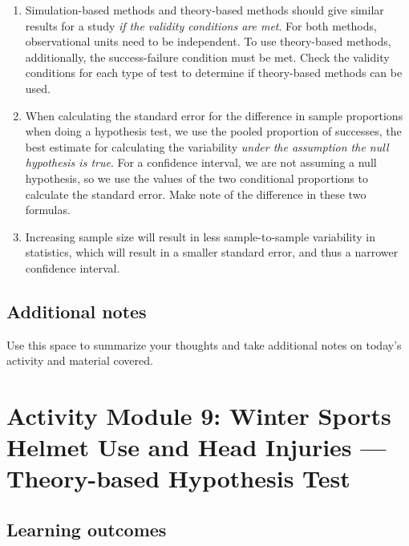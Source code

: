 \documentclass[
]{report}
\begin{document}
\begin{enumerate}
\def\labelenumi{\arabic{enumi}.}
\item
  Simulation-based methods and theory-based methods should give similar results for a study \emph{if the validity conditions are met}. For both methods, observational units need to be independent. To use theory-based methods, additionally, the success-failure condition must be met. Check the validity conditions for each type of test to determine if theory-based methods can be used.
\item
  When calculating the standard error for the difference in sample proportions when doing a hypothesis test, we use the pooled proportion of successes, the best estimate for calculating the variability \emph{under the assumption the null hypothesis is true}. For a confidence interval, we are not assuming a null hypothesis, so we use the values of the two conditional proportions to calculate the standard error. Make note of the difference in these two formulas.
\item
  Increasing sample size will result in less sample-to-sample variability in statistics, which will result in a smaller standard error, and thus a narrower confidence interval.
\end{enumerate}

\hypertarget{additional-notes-14}{%
\subsection{Additional notes}\label{additional-notes-14}}

Use this space to summarize your thoughts and take additional notes on today's activity and material covered.

\newpage

\hypertarget{activity-module-9-winter-sports-helmet-use-and-head-injuries-theory-based-hypothesis-test}{%
\section{Activity Module 9: Winter Sports Helmet Use and Head Injuries --- Theory-based Hypothesis Test}\label{activity-module-9-winter-sports-helmet-use-and-head-injuries-theory-based-hypothesis-test}}


\hypertarget{learning-outcomes-18}{%
\subsection{Learning outcomes}\label{learning-outcomes-18}}
\end{document}
